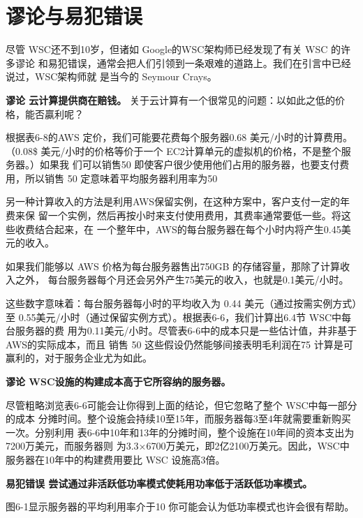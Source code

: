\section{谬论与易犯错误}
尽管 WSC还不到10岁，但诸如 Google的WSC架构师已经发现了有关 WSC 的许多谬论
和易犯错误，通常会把人们引领到一条艰难的道路上。我们在引言中已经说过，WSC架构师就
是当今的 Seymour Crays。

\textbf{谬论 云计算提供商在赔钱。}
关于云计算有一个很常见的问题：以如此之低的价格，能否贏利呢？

根据表6-8的AWS 定价，我们可能要花费每个服务器0.68 美元/小时的计算费用。
（0.08\$ 美元/小时的价格等价于一个 EC2计算单元的虚拟机的价格，不是整个服务器。）如果我
们可以销售50%
即使客户很少使用他们占用的服务器，也要支付费用，所以销售 50%
定意味着平均服务器利用率为50%

另一种计算收入的方法是利用AWS保留实例，在这种方案中，客户支付一定的年费来保
留一个实例，然后再按小时来支付使用费用，其费率通常要低一些。将这些收费结合起来，在
一个整年中，AWS的每台服务器在每个小时内将产生0.45美元的收入。

如果我们能够以 AWS 价格为每台服务器售出750GB 的存储容量，那除了计算收入之外，
每台服务器每个月还会另外产生75美元的收入，也就是0.1美元/小时。

这些数字意味着：每台服务器每小时的平均收入为 0.44 美元（通过按需实例方式）至
0.55美元/小时（通过保留实例方式）。根据表6-6，我们计算出6.4节 WSC中每台服务器的费
用为0.11美元/小时。尽管表6-6中的成本只是一些估计值，井非基于AWS的实际成本，而且
销售 50%
这些假设仍然能够间接表明毛利润在75%
计算是可赢利的，对于服务企业尤为如此。

\textbf{谬论 WSC设施的构建成本高于它所容纳的服务器。}

尽管粗略浏览表6-6可能会让你得到上面的结论，但它忽略了整个 WSC中每一部分的成本
分摊时间。整个设施会持续10至15年，而服务器每3至4年就需要重新购买一次。分别利用
表6-6中10年和13年的分摊时间，整个设施在10年间的资本支出为7200万美元，而服务器则
为3.3×6700万美元，即2亿2100万美元。因此，WSC中服务器在10年中的构建费用要比 WSC
设施高3倍。

\textbf{易犯错误 尝试通过非活跃低功率模式使耗用功率低于活跃低功率模式。}

图6-1显示服务器的平均利用率介于10%
你可能会认为低功率模式也许会很有帮助。


